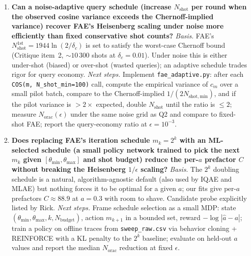 \begin{enumerate}
\item \textbf{Can a noise-adaptive query schedule (increase $N_{\mathrm{shot}}$ per round when the observed cosine variance exceeds the Chernoff-implied variance) recover FAE's Heisenberg scaling under noise more efficiently than fixed conservative shot counts?}
\emph{Basis.} FAE's $N_{\mathrm{shot}}^{1\mathrm{st}} = 1944\ln(2/\delta_{c})$ is set to satisfy the worst-case Chernoff bound (Critique item~2, $\sim\!10\,300$ shots at $\delta_{c}=0.01$). Under noise this is either under-shot (biased) or over-shot (wasted queries); an adaptive schedule trades rigor for query economy.
\emph{Next steps.} Implement \texttt{fae\_adaptive.py}: after each \texttt{COS(m, N\_shot\_min=100)} call, compute the empirical variance of $c_{m}$ over a small pilot batch, compare to the Chernoff-implied $1/(2 N_{\mathrm{shot,min}})$, and if the pilot variance is $>\!2\times$ expected, double $N_{\mathrm{shot}}$ until the ratio is $\leq\!2$; measure $N_{\mathrm{orac}}(\epsilon)$ under the same noise grid as Q2 and compare to fixed-shot FAE; report the query-economy ratio at $\epsilon = 10^{-3}$.

\item \textbf{Does replacing FAE's iteration schedule $m_{k} = 2^{k}$ with an ML-selected schedule (a small policy network trained to pick the next $m_{k}$ given $[\theta_{\min}, \theta_{\max}]$ and shot budget) reduce the per-$a$ prefactor $C$ without breaking the Heisenberg $1/\epsilon$ scaling?}
\emph{Basis.} The $2^{k}$ doubling schedule is a natural, algorithm-agnostic default (also used by IQAE and MLAE) but nothing forces it to be optimal for a given $a$; our fits give per-$a$ prefactors $C \approx 88.9$ at $a=0.3$ with room to shave. Candidate probe explicitly listed by Rick.
\emph{Next steps.} Frame schedule selection as a small MDP: state $(\theta_{\min}, \theta_{\max}, k, N_{\mathrm{budget}})$, action $m_{k+1}$ in a bounded set, reward $-\log|\hat a - a|$; train a policy on offline traces from \texttt{sweep\_raw.csv} via behavior cloning + REINFORCE with a KL penalty to the $2^{k}$ baseline; evaluate on held-out $a$ values and report the median $N_{\mathrm{orac}}$ reduction at fixed $\epsilon$.


\end{enumerate}
